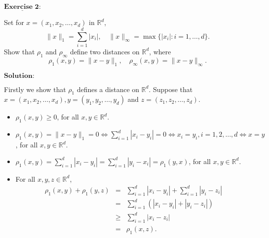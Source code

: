 \documentclass[12pt,a4paper]{ctexart}
\begin{document}
\newpage 

$\underline{\textbf{Exercise 2:}}$

Set for $x = (x_1, x_2, \dots, x_d)$ in $\mathbb R^d$,
$$\|x\|_1 = \sum_{i=1}^{d} |x_i|, \quad \|x\|_{\infty} = \max \{|x_i|: i = 1, \dots, d \}.$$
Show that $\rho_1$ and $\rho_{\infty}$ define two distances on $\mathbb R^d$, where
$$\rho_1 (x, y) = \|x - y\|_1, \quad \rho_{\infty}(x, y) = \|x-y\|_{\infty}.$$

\vspace{8pt}
$\textbf{Solution:}$

Firstly we show that $\rho_1$ defines a distance on $\mathbb R^d$. Suppose that $x = (x_1, x_2, \dots, x_d), y = (y_1, y_2, \dots, y_d)$ and $z = (z_1, z_2, \dots, z_d)$.
\begin{itemize}
    \item $\rho_1(x,y) \geq 0$, for all $x, y \in \mathbb R^d$.
    \item $\rho_1(x,y) = \|x - y\|_1 = 0 \Leftrightarrow  \sum_{i=1}^{d} |x_i - y_i| = 0 \Leftrightarrow x_i = y_i, i = 1, 2, \dots, d \Leftrightarrow x = y$, for all $x, y \in \mathbb R^d$.
    \item $\rho_1(x,y) = \sum_{i=1}^{d} |x_i - y_i| = \sum_{i=1}^{d} |y_i - x_i|= \rho_1(y,x)$, for all $x, y \in \mathbb R^d$. 
    \item For all $x, y, z\in \mathbb R^d$,
    \begin{eqnarray*}
    \rho_1(x, y) + \rho_1(y, z) & = & \sum_{i=1}^{d} |x_i - y_i| + \sum_{i=1}^{d} |y_i - z_i|  \\
    & = & \sum_{i=1}^{d} (|x_i - y_i| + |y_i - z_i|) \\
    & \geq & \sum_{i=1}^{d} |x_i - z_i| \\
    & = & \rho_1(x, z).
\end{eqnarray*}
\end{itemize}
\end{document}
